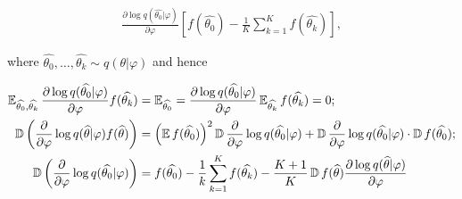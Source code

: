 \begin{equation*}
    \begin{aligned}
        \frac{\partial \log q(\widehat{\theta_0} | \varphi)}{\partial \varphi} \left[ f(\widehat{\theta_0}) - \frac{1}{K} \sum_{k = 1}^K f(\widehat{\theta_k}) \right], 
    \end{aligned}
\end{equation*}

where $\widehat{\theta_0}, \ldots, \widehat{\theta_k} \sim q(\theta | \varphi)$ and hence

\begin{equation*}
    \begin{aligned}
        \operatorname{\mathbb{E}}_{\widehat{\theta_0}, \widehat{\theta_k}} \frac{\partial \log q (\widehat{\theta_0} | \varphi)}{\partial \varphi} f(\widehat{\theta_k}) &= \operatorname{\mathbb{E}}_{\widehat{\theta_0}} = \frac{\partial \log q(\widehat{\theta_0} | \varphi)}{\partial \varphi} \operatorname{\mathbb{E}}_{\widehat{\theta_k}} f(\widehat{\theta_k}) = 0; \\ 
        \operatorname{\mathbb{D}} \left(\frac{\partial}{\partial \varphi} \log q(\widehat{\theta} | \varphi) f(\widehat{\theta})\right) &= \left( \operatorname{\mathbb{E}} f(\widehat{\theta_0}) \right)^2 \operatorname{\mathbb{D}} \frac{\partial}{\partial \varphi} \log q(\widehat{\theta_0} | \varphi) + \operatorname{\mathbb{D}} \frac{\partial}{\partial \varphi} \log q(\widehat{\theta_0} | \varphi) \cdot \operatorname{\mathbb{D}} f(\widehat{\theta_0}); \\ 
        \operatorname{\mathbb{D}} \left( \frac{\partial}{\partial \varphi} \log q(\widehat{\theta_0} | \varphi) \right) &= f(\widehat{\theta_0}) - \frac{1}{k} \sum_{k = 1}^K f(\widehat{\theta_k}) - \frac{K + 1}{K} \operatorname{\mathbb{D}} f(\widehat{\theta}) \frac{\partial \log q (\widehat{\theta} | \varphi)}{\partial \varphi}
    \end{aligned}
\end{equation*}




